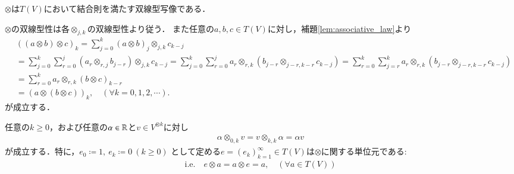 	\begin{screen}
		\begin{thm}\label{thm:otimes_is_a_multiplication}
			$\otimes$は$T(V)$において結合則を満たす双線型写像である．
		\end{thm}
	\end{screen}
	
	\begin{prf}
		$\otimes$の双線型性は各$\otimes_{j,k}$の双線型性より従う．
		また任意の$a,b,c \in T(V)$に対し，補題\ref{lem:associative_law}より
		\begin{align}
			&((a \otimes b) \otimes c)_k
			= \sum_{j=0}^k (a \otimes b)_j \otimes_{j,k} c_{k-j} \\
			&= \sum_{j=0}^k \sum_{r=0}^j \left( a_r \otimes_{r,j} b_{j-r} \right) \otimes_{j,k} c_{k-j}
			= \sum_{j=0}^k \sum_{r=0}^j a_r \otimes_{r,k} \left( b_{j-r} \otimes_{j-r,k-r} c_{k-j} \right)
			= \sum_{r=0}^k \sum_{j=r}^k a_r \otimes_{r,k} \left( b_{j-r} \otimes_{j-r,k-r} c_{k-j} \right) \\
			&= \sum_{r=0}^k a_r \otimes_{r,k} (b \otimes c)_{k-r} \\
			&= (a \otimes (b \otimes c))_k,
			\quad (\forall k = 0,1,2,\cdots).
		\end{align}
		が成立する．
		\QED
	\end{prf}
	
	\begin{screen}
		\begin{thm}[$T(V)$の単位元]
			任意の$k \geq 0$，および任意の$\alpha \in \mathbb{R}$と$v \in V^{\otimes k}$に対し
			\begin{align}
				\alpha \otimes_{0,k} v = v \otimes_{k,k} \alpha = \alpha v
				\label{eq:thm_identity_element_of_T_V}
			\end{align}
			が成立する．特に，$e_0 \coloneqq 1,\ e_k \coloneqq 0\ (k \geq 0)$
			として定める$e=(e_k)_{k=1}^\infty \in T(V)$は$\otimes$に関する単位元である:
			\begin{align}
				\mbox{i.e.}\quad
				e \otimes a = a \otimes e = a,
				\quad (\forall a \in T(V))
			\end{align}
		\end{thm}
	\end{screen}
	

